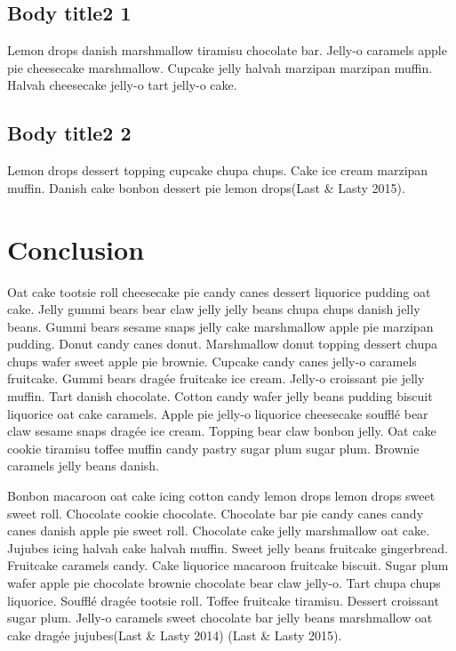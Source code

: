 \documentclass[12pt,]{article}
\begin{document}
\subsection{Body title2 1}\label{body-title2-1}

Lemon drops danish marshmallow tiramisu chocolate bar. Jelly-o caramels
apple pie cheesecake marshmallow. Cupcake jelly halvah marzipan marzipan
muffin. Halvah cheesecake jelly-o tart jelly-o cake.

\subsection{Body title2 2}\label{body-title2-2}

Lemon drops dessert topping cupcake chupa chups. Cake ice cream marzipan
muffin. Danish cake bonbon dessert pie lemon drops(Last \& Lasty 2015).

\section{Conclusion}\label{conclusion}

Oat cake tootsie roll cheesecake pie candy canes dessert liquorice
pudding oat cake. Jelly gummi bears bear claw jelly jelly beans chupa
chups danish jelly beans. Gummi bears sesame snaps jelly cake
marshmallow apple pie marzipan pudding. Donut candy canes donut.
Marshmallow donut topping dessert chupa chups wafer sweet apple pie
brownie. Cupcake candy canes jelly-o caramels fruitcake. Gummi bears
dragée fruitcake ice cream. Jelly-o croissant pie jelly muffin. Tart
danish chocolate. Cotton candy wafer jelly beans pudding biscuit
liquorice oat cake caramels. Apple pie jelly-o liquorice cheesecake
soufflé bear claw sesame snaps dragée ice cream. Topping bear claw
bonbon jelly. Oat cake cookie tiramisu toffee muffin candy pastry sugar
plum sugar plum. Brownie caramels jelly beans danish.

Bonbon macaroon oat cake icing cotton candy lemon drops lemon drops
sweet sweet roll. Chocolate cookie chocolate. Chocolate bar pie candy
canes candy canes danish apple pie sweet roll. Chocolate cake jelly
marshmallow oat cake. Jujubes icing halvah cake halvah muffin. Sweet
jelly beans fruitcake gingerbread. Fruitcake caramels candy. Cake
liquorice macaroon fruitcake biscuit. Sugar plum wafer apple pie
chocolate brownie chocolate bear claw jelly-o. Tart chupa chups
liquorice. Soufflé dragée tootsie roll. Toffee fruitcake tiramisu.
Dessert croissant sugar plum. Jelly-o caramels sweet chocolate bar jelly
beans marshmallow oat cake dragée jujubes(Last \& Lasty 2014) (Last \&
Lasty 2015).
\end{document}
